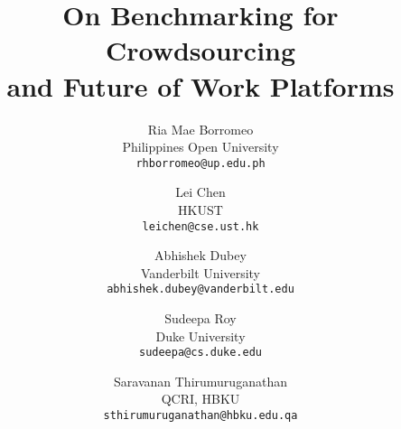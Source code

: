 \documentclass[11pt]{article}
\begin{document}
\title{On Benchmarking for Crowdsourcing\\ and Future of Work Platforms}
\author{Ria Mae Borromeo\\
Philippines Open University\\
\texttt{{\footnotesize rhborromeo@up.edu.ph}}
\and
Lei Chen\\
HKUST\\
\texttt{{\footnotesize leichen@cse.ust.hk}}
\and
Abhishek Dubey\\
Vanderbilt University\\
\texttt{{\footnotesize abhishek.dubey@vanderbilt.edu}}
\and
Sudeepa Roy\\
Duke University\\
\texttt{{\footnotesize sudeepa@cs.duke.edu}}
\and
Saravanan Thirumuruganathan\\
QCRI, HBKU\\
\texttt{{\footnotesize sthirumuruganathan@hbku.edu.qa}}
}
\maketitle







%
%




\end{document}
